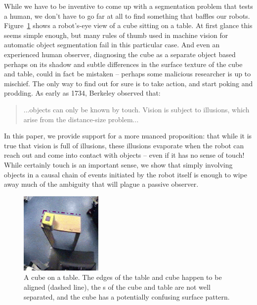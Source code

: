 While we have to be inventive to come up with a segmentation problem
that tests a human, we don't have to go far at all to find something
that baffles our robots.  Figure~\ref{fig:setup-sequence} shows a
robot's-eye view of a cube sitting on a table. At first glance this
seems simple enough, but many rules of thumb used in machine vision
for automatic object segmentation fail in this particular case.  And
even an experienced human observer, diagnosing the cube as a separate
object based perhaps on its shadow and subtle differences in the
surface texture of the cube and table, could in fact be mistaken --
perhaps some malicious researcher is up to mischief.  The only way to
find out for sure is to take action, and start poking and prodding.
As early as 1734, Berkeley observed that:
%
\begin{quote}
...objects can only be known by
touch. Vision is subject to illusions, which arise from the
distance-size problem... \cite{berkeley72new}
\end{quote}
%
In this paper, we provide support for a more nuanced proposition: that
while it is true that vision is full of illusions, these illusions
evaporate when the robot can reach out and come into contact with
objects -- even if it has no sense of touch!  While certainly touch is
an important sense, we show that simply involving objects in a causal
chain of events initiated by the robot itself is enough to wipe away much
of the ambiguity that will plague a passive observer.

%
\begin{figure}[tbh]
\begin{center}
\includegraphics[width=4cm]{setup-sequence.eps}
\caption{ 
\label{fig:setup-sequence}
%
A cube on a table. The edges of the table and cube happen to be
aligned (dashed line), the \ahhcolor{}s of the cube and table are not well
separated, and the cube has a potentially confusing surface pattern.
%
}
\end{center}
\end{figure}



